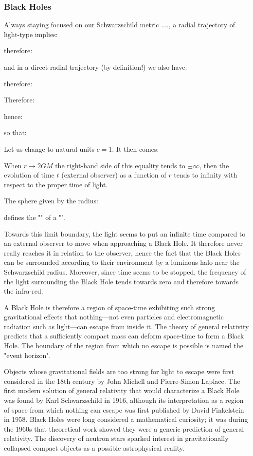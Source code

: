 	\pagebreak
	\subsubsection{Black Holes}\label{black hole}
	Always staying focused on our Schwarzschild metric ...., a radial trajectory of light-type implies:
	
	therefore:
	
	and in a direct radial trajectory (by definition!) we also have:
	
	therefore:
	
	Therefore:
	
	hence:
	
	so that:
	
	Let us change to natural units $c=1$. It then comes:
	
	When $r\rightarrow 2GM$ the right-hand side of this equality tends to $\pm \infty$, then the evolution of time $t$ (external observer) as a function of $r$ tends to infinity with respect to the proper time of light.

	The sphere given by the radius:
	
	defines the "" of a "".
	
	Towards this limit boundary, the light seems to put an infinite time compared to an external observer to move when approaching a Black Hole. It therefore never really reaches it in relation to the observer, hence the fact that the Black Holes can be surrounded according to their environment by a luminous halo near the Schwarzschild radius. Moreover, since time seems to be stopped, the frequency of the light surrounding the Black Hole tends towards zero and therefore towards the infra-red.

	A Black Hole is therefore a region of space-time exhibiting such strong gravitational effects that nothing—not even particles and electromagnetic radiation such as light—can escape from inside it. The theory of general relativity predicts that a sufficiently compact mass can deform space-time to form a Black Hole. The boundary of the region from which no escape is possible is named the "event horizon". 

	Objects whose gravitational fields are too strong for light to escape were first considered in the 18th century by John Michell and Pierre-Simon Laplace. The first modern solution of general relativity that would characterize a Black Hole was found by Karl Schwarzschild in 1916, although its interpretation as a region of space from which nothing can escape was first published by David Finkelstein in 1958. Black Holes were long considered a mathematical curiosity; it was during the 1960s that theoretical work showed they were a generic prediction of general relativity. The discovery of neutron stars sparked interest in gravitationally collapsed compact objects as a possible astrophysical reality.

